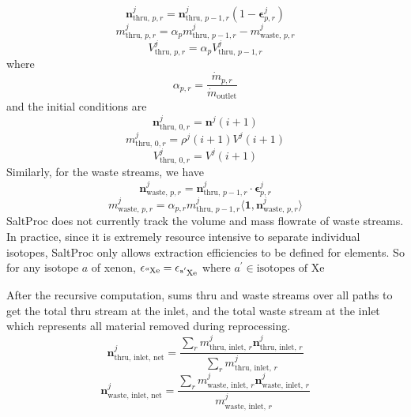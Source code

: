 \begin{equation}
    \mathbf{n}^{j}_{\text{thru, }p,r} = \mathbf{n}^{j}_{\text{thru, }p-1,r} (1 - \pmb{\epsilon}^{j}_{p,r})
\end{equation}
\begin{equation}
    m^{j}_{\text{thru, } p,r} = \alpha_{p} m^{j}_{\text{thru, }p-1,r} - m^{j}_{\text{waste, }p,r}
\end{equation}
\begin{equation}
    V^{j}_{\text{thru, }p,r} = \alpha_{p}V^{j}_{\text{thru, }p-1,r}
\end{equation}
where 
\begin{equation}
    \alpha_{p,r} = \frac{\dot{m}_{p,r}}{\dot{m}_{\text{outlet}}}
\end{equation}
and the initial conditions are 
\begin{equation}
    \mathbf{n}^{j}_{\text{thru, }0,r} = \mathbf{n}^{j}(i+1)
\end{equation}
\begin{equation}
    m^{j}_{\text{thru, }0,r} = \rho^{j}(i+1)V^{j}(i+1)
\end{equation}
\begin{equation}
    V^{j}_{\text{thru, }0,r} = V^{j}(i+1)
\end{equation}
Similarly, for the waste streams, we have
\begin{equation}
    \mathbf{n}^{j}_{\text{waste, }p,r} = \mathbf{n}^{j}_{\text{thru, }p-1,r} \cdot \pmb{\epsilon}^{j}_{p,r}
\end{equation}
\begin{equation}
    m^{j}_{\text{waste, }p,r} = \alpha_{p,r} m^{j}_{\text{thru, }p-1,r} \langle\mathbf{1},\mathbf{n}^{j}_{\text{waste, }p,r}\rangle
\end{equation}
SaltProc does not currently track the volume and mass flowrate of waste streams.
In practice, since it is extremely resource intensive to separate individual
isotopes, SaltProc only allows extraction efficiencies to be defined for
elements. So for any isotope $a$ of xenon,
$\epsilon_{\ce{^{a}Xe}} = \epsilon_{\ce{^{a^{\prime}}Xe}}$  where
$a^{\prime} \in \text{isotopes of Xe}$

After the recursive computation, \SaltProc sums thru and waste streams over all
paths to get the total thru stream at the inlet, and the total waste stream at
the inlet which represents all material removed during reprocessing.
\begin{equation}
    \mathbf{n}^{j}_\text{thru, inlet, net} = \frac{\sum_{r} m^{j}_{\text{thru, inlet, }r} \mathbf{n}^{j}_{\text{thru, inlet, }r}}{\sum_{r} m^{j}_{\text{thru, inlet, }r}}
\end{equation}
\begin{equation}
    \mathbf{n}^{j}_{\text{waste, inlet, net}} = \frac{\sum_{r} m^{j}_{\text{waste, inlet, }r} \mathbf{n}^{j}_{\text{waste, inlet, }r}}{m^{j}_{\text{waste, inlet, }r}}
\end{equation}

